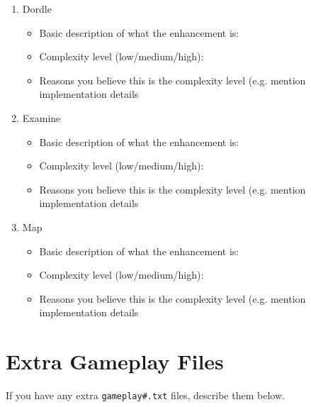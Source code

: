 \documentclass[11pt]{article}
\begin{document}
\begin{enumerate}
\item Dordle
	\begin{itemize}
	\item Basic description of what the enhancement is:
	\item Complexity level (low/medium/high):
	\item Reasons you believe this is the complexity level (e.g. mention implementation details
	\end{itemize}

\item Examine
	\begin{itemize}
	\item Basic description of what the enhancement is:
	\item Complexity level (low/medium/high):
	\item Reasons you believe this is the complexity level (e.g. mention implementation details
	\end{itemize}

\item Map
	\begin{itemize}
	\item Basic description of what the enhancement is:
	\item Complexity level (low/medium/high):
	\item Reasons you believe this is the complexity level (e.g. mention implementation details
	\end{itemize}




\end{enumerate}


\section*{Extra Gameplay Files}

If you have any extra \texttt{gameplay\#.txt} files, describe them below.
\end{document}
